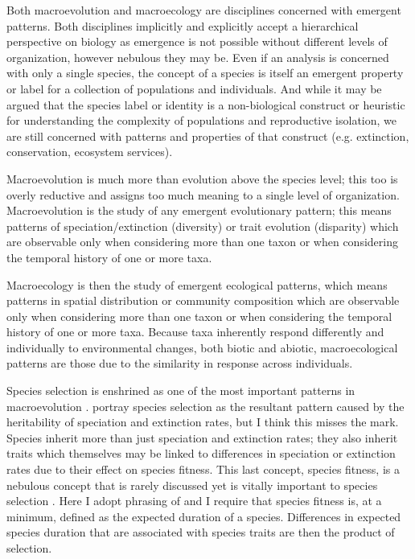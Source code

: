 Both macroevolution and macroecology are disciplines concerned with emergent patterns. Both disciplines implicitly and explicitly accept a hierarchical perspective on biology as emergence is not possible without different levels of organization, however nebulous they may be. Even if an analysis is concerned with only a single species, the concept of a species is itself an emergent property or label for a collection of populations and individuals. And while it may be argued that the species label or identity is a non-biological construct or heuristic for understanding the complexity of populations and reproductive isolation, we are still concerned with patterns and properties of that construct (e.g. extinction, conservation, ecosystem services).

Macroevolution is much more than evolution above the species level; this too is overly reductive and assigns too much meaning to a single level of organization. Macroevolution is the study of any emergent evolutionary pattern; this means patterns of speciation/extinction (diversity) or trait evolution (disparity) which are observable only when considering more than one taxon or when considering the temporal history of one or more taxa.

Macroecology is then the study of emergent ecological patterns, which means patterns in spatial distribution or community composition which are observable only when considering more than one taxon or when considering the temporal history of one or more taxa. Because taxa inherently respond differently and individually to environmental changes, both biotic and abiotic, macroecological patterns are those due to the similarity in response across individuals.




Species selection is enshrined as one of the most important patterns in macroevolution \citep{Stanley1975,Stanley1979,Vrba1986,Jablonski2008a,Rabosky2010b,Simpson2016a,Pennell2014}. \citet{Rabosky2010b} portray species selection as the resultant pattern caused by the heritability of speciation and extinction rates, but I think this misses the mark. Species inherit more than just speciation and extinction rates; they also inherit traits which themselves may be linked to differences in speciation or extinction rates due to their effect on species fitness. This last concept, species fitness, is a nebulous concept that is rarely discussed yet is vitally important to species selection \citep{Cooper1984,Palmer2012}. Here I adopt phrasing of \citet{Cooper1984} and I require that species fitness is, at a minimum, defined as the expected duration of a species. Differences in expected species duration that are associated with species traits are then the product of selection.

